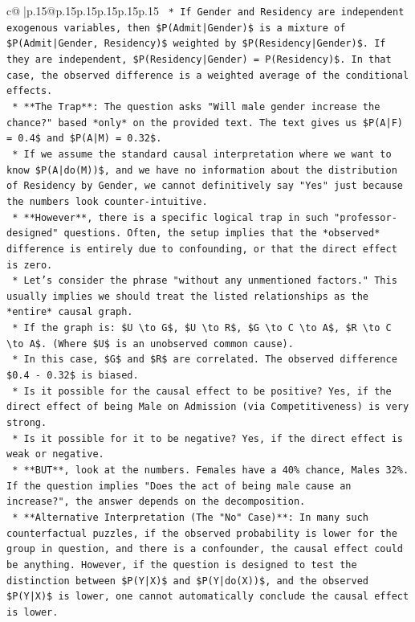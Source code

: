 \documentclass{article}
\begin{document}
{\begin{supertabular}{c@{$\;$}|p{.15\linewidth}@{}p{.15\linewidth}p{.15\linewidth}p{.15\linewidth}p{.15\linewidth}p{.15\linewidth}}
{{{\texttt{    *   If Gender and Residency are independent exogenous variables, then \$P(Admit|Gender)\$ is a mixture of \$P(Admit|Gender, Residency)\$ weighted by \$P(Residency|Gender)\$. If they are independent, \$P(Residency|Gender) = P(Residency)\$. In that case, the observed difference is a weighted average of the conditional effects.} \\
\texttt{    *   **The Trap**: The question asks "Will male gender increase the chance?" based *only* on the provided text. The text gives us \$P(A|F) = 0.4\$ and \$P(A|M) = 0.32\$.} \\
\texttt{    *   If we assume the standard causal interpretation where we want to know \$P(A|do(M))\$, and we have no information about the distribution of Residency by Gender, we cannot definitively say "Yes" just because the numbers look counter{-}intuitive.} \\
\texttt{    *   **However**, there is a specific logical trap in such "professor{-}designed" questions. Often, the setup implies that the *observed* difference is entirely due to confounding, or that the direct effect is zero.} \\
\texttt{    *   Let's consider the phrase "without any unmentioned factors." This usually implies we should treat the listed relationships as the *entire* causal graph.} \\
\texttt{    *   If the graph is: \$U \textbackslash{}to G\$, \$U \textbackslash{}to R\$, \$G \textbackslash{}to C \textbackslash{}to A\$, \$R \textbackslash{}to C \textbackslash{}to A\$. (Where \$U\$ is an unobserved common cause).} \\
\texttt{    *   In this case, \$G\$ and \$R\$ are correlated. The observed difference \$0.4 {-} 0.32\$ is biased.} \\
\texttt{    *   Is it possible for the causal effect to be positive? Yes, if the direct effect of being Male on Admission (via Competitiveness) is very strong.} \\
\texttt{    *   Is it possible for it to be negative? Yes, if the direct effect is weak or negative.} \\
\texttt{    *   **BUT**, look at the numbers. Females have a 40\% chance, Males 32\%. If the question implies "Does the act of being male cause an increase?", the answer depends on the decomposition.} \\
\texttt{    *   **Alternative Interpretation (The "No" Case)**: In many such counterfactual puzzles, if the observed probability is lower for the group in question, and there is a confounder, the causal effect could be anything. However, if the question is designed to test the distinction between \$P(Y|X)\$ and \$P(Y|do(X))\$, and the observed \$P(Y|X)\$ is lower, one cannot automatically conclude the causal effect is lower.} \\
}}}
\end{supertabular}}
\end{document}
